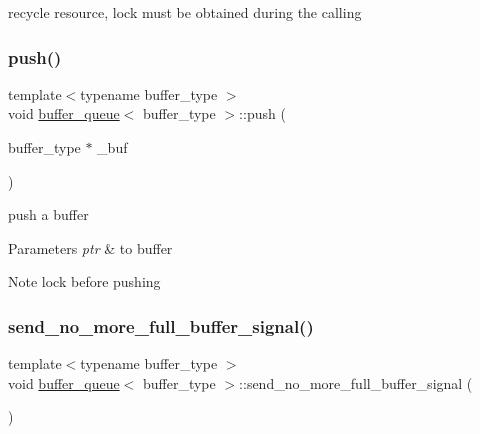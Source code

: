 recycle resource, lock must be obtained during the calling 

\mbox{\label{structbuffer__queue_a13c104db4054ca0cb59b5e0502267d55}} 
\subsubsection{\texorpdfstring{push()}{push()}\hspace{0.1cm}{\footnotesize\ttfamily [2/2]}}
{\footnotesize\ttfamily template$<$typename buffer\+\_\+type $>$ \\
void \hyperlink{structbuffer__queue}{buffer\+\_\+queue}$<$ buffer\+\_\+type $>$\+::push (\begin{DoxyParamCaption}\item[{buffer\+\_\+type $\ast$}]{\+\_\+buf }\end{DoxyParamCaption})\hspace{0.3cm}{\ttfamily [inline]}}



push a buffer 


\begin{DoxyParams}{Parameters}
{\em ptr} & to buffer \\
\hline
\end{DoxyParams}
\begin{DoxyNote}{Note}
lock before pushing 
\end{DoxyNote}
\mbox{\label{structbuffer__queue_a487335f8827c09d4d76d588e47d633ac}} 
\subsubsection{\texorpdfstring{send\+\_\+no\+\_\+more\+\_\+full\+\_\+buffer\+\_\+signal()}{send\_no\_more\_full\_buffer\_signal()}\hspace{0.1cm}{\footnotesize\ttfamily [1/2]}}
{\footnotesize\ttfamily template$<$typename buffer\+\_\+type $>$ \\
void \hyperlink{structbuffer__queue}{buffer\+\_\+queue}$<$ buffer\+\_\+type $>$\+::send\+\_\+no\+\_\+more\+\_\+full\+\_\+buffer\+\_\+signal (\begin{DoxyParamCaption}{ }\end{DoxyParamCaption})\hspace{0.3cm}{\ttfamily [inline]}}



